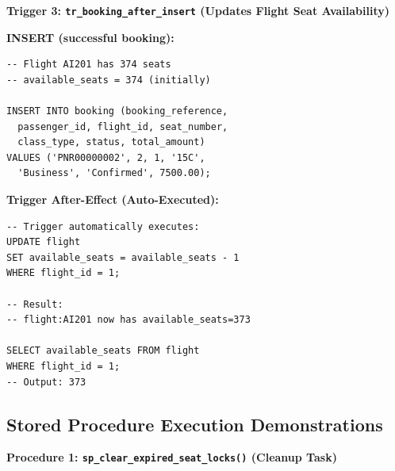 \documentclass[12pt, a4paper]{article}
\begin{document}
\vspace{0.3cm}

\textbf{Trigger 3: \texttt{tr\_booking\_after\_insert} (Updates Flight Seat Availability)}

\noindent\begin{minipage}[t]{0.48\textwidth}
\textbf{INSERT (successful booking):}
\begin{lstlisting}[style=sqlstyle,basicstyle=\tiny\ttfamily,showstringspaces=false]
-- Flight AI201 has 374 seats
-- available_seats = 374 (initially)

INSERT INTO booking (booking_reference, 
  passenger_id, flight_id, seat_number, 
  class_type, status, total_amount)
VALUES ('PNR00000002', 2, 1, '15C', 
  'Business', 'Confirmed', 7500.00);
\end{lstlisting}
\end{minipage}\hfill
\begin{minipage}[t]{0.48\textwidth}
\textbf{Trigger After-Effect (Auto-Executed):}
\begin{lstlisting}[style=sqlstyle,basicstyle=\tiny\ttfamily,showstringspaces=false]
-- Trigger automatically executes:
UPDATE flight 
SET available_seats = available_seats - 1 
WHERE flight_id = 1;

-- Result:
-- flight:AI201 now has available_seats=373

SELECT available_seats FROM flight 
WHERE flight_id = 1;
-- Output: 373
\end{lstlisting}
\end{minipage}

\subsection{Stored Procedure Execution Demonstrations}

\textbf{Procedure 1: \texttt{sp\_clear\_expired\_seat\_locks()} (Cleanup Task)}
\end{document}
